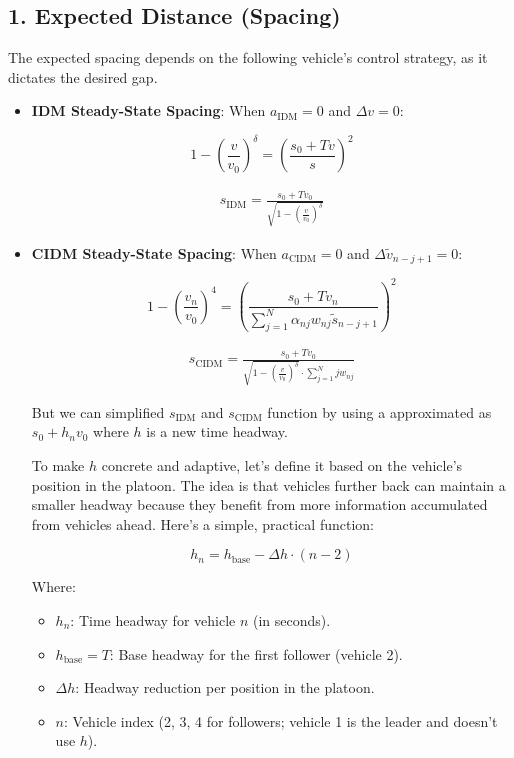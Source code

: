 \documentclass[letterpaper, 10pt, conference]{ieeeconf}  %
\begin{document}
\subsection*{1. Expected Distance (Spacing)}
The expected spacing depends on the following vehicle's control strategy, as it dictates the desired gap.

\begin{itemize}
    \item \textbf{IDM Steady-State Spacing}: When \(a_{\text{IDM}} = 0\) and \(\Delta v = 0\):

    \[ 1 - \left( \frac{v}{v_0} \right)^\delta = \left( \frac{s_0 + T v}{s} \right)^2 \]

\begin{align}
    s_{\text{IDM}} = \frac{s_0 + T v_0}{\sqrt{1 - \left( \frac{v}{v_0} \right)^\delta}}
\end{align}
    


    \item \textbf{CIDM Steady-State Spacing}: When \(a_{\text{CIDM}} = 0\) and \(\Delta \tilde{v}_{n-j+1} = 0\):

    \[ 1 - \left( \frac{v_n}{v_0} \right)^4 = \left( \frac{s_0 + T v_n}{\sum_{j=1}^N \alpha_{n j} w_{n j} \tilde{s}_{n-j+1}} \right)^2 \]



\begin{align}
    s_{\text{CIDM}} = \frac{s_0 + T v_0}{\sqrt{1 - \left( \frac{v}{v_0} \right)^\delta}\cdot \sum_{j=1}^N j w_{n j}}
\end{align}

But we can simplified $s_{\text{IDM}}$ and $s_{\text{CIDM}}$ function by using a approximated as $s_0 + h_n v_0 $ where $h$ is a new time headway.

To make \( h \) concrete and adaptive, let's define it based on the vehicle's position in the platoon. The idea is that vehicles further back can maintain a smaller headway because they benefit from more information accumulated from vehicles ahead. Here's a simple, practical function:

\[ h_n = h_{\text{base}} - \Delta h \cdot (n - 2) \]

Where:
\begin{itemize}
    \item \( h_n \): Time headway for vehicle \( n \) (in seconds).
    \item \( h_{\text{base}} = T \): Base headway for the first follower (vehicle 2).
    \item \( \Delta h \): Headway reduction per position in the platoon.
    \item \( n \): Vehicle index (2, 3, 4 for followers; vehicle 1 is the leader and doesn't use \( h \)).
\end{itemize}


\end{itemize}
\end{document}
